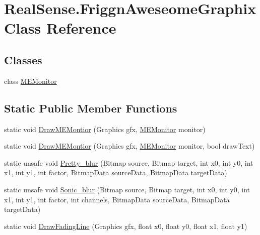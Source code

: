 \hypertarget{class_real_sense_1_1_friggn_aweseome_graphix}{}\section{Real\+Sense.\+Friggn\+Aweseome\+Graphix Class Reference}
\label{class_real_sense_1_1_friggn_aweseome_graphix}
\subsection*{Classes}
\begin{DoxyCompactItemize}
\item 
class \hyperlink{class_real_sense_1_1_friggn_aweseome_graphix_1_1_m_e_monitor}{M\+E\+Monitor}
\end{DoxyCompactItemize}
\subsection*{Static Public Member Functions}
\begin{DoxyCompactItemize}
\item 
static void \hyperlink{class_real_sense_1_1_friggn_aweseome_graphix_a9ebb178f63594b6b6dd9d650703de4d9}{Draw\+M\+E\+Montior} (Graphics gfx, \hyperlink{class_real_sense_1_1_friggn_aweseome_graphix_1_1_m_e_monitor}{M\+E\+Monitor} monitor)
\item 
static void \hyperlink{class_real_sense_1_1_friggn_aweseome_graphix_a79beae7f9b0458501156b023e3917d49}{Draw\+M\+E\+Montior} (Graphics gfx, \hyperlink{class_real_sense_1_1_friggn_aweseome_graphix_1_1_m_e_monitor}{M\+E\+Monitor} monitor, bool draw\+Text)
\item 
static unsafe void \hyperlink{class_real_sense_1_1_friggn_aweseome_graphix_a9e0391199c5b77e3153684deb2e30c5c}{Pretty\+\_\+blur} (Bitmap source, Bitmap target, int x0, int y0, int x1, int y1, int factor, Bitmap\+Data source\+Data, Bitmap\+Data target\+Data)
\item 
static unsafe void \hyperlink{class_real_sense_1_1_friggn_aweseome_graphix_aa9bd286dcff99c200fabc8368c9d41ff}{Sonic\+\_\+blur} (Bitmap source, Bitmap target, int x0, int y0, int x1, int y1, int factor, int channels, Bitmap\+Data source\+Data, Bitmap\+Data target\+Data)
\item 
static void \hyperlink{class_real_sense_1_1_friggn_aweseome_graphix_a213322f957a49429ac2a3017abdf49aa}{Draw\+Fading\+Line} (Graphics gfx, float x0, float y0, float x1, float y1)
\end{DoxyCompactItemize}

